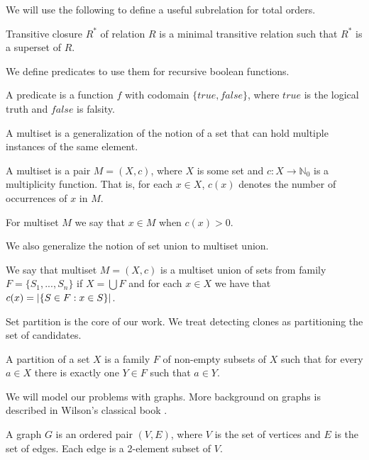 We will use the following to define a useful subrelation for total orders.

\begin{defn}
Transitive closure $R^*$ of relation $R$ is a minimal transitive relation 
such that $R^*$ is a superset of $R$.
\end{defn}

We define predicates to use them for recursive boolean functions.

\begin{defn}[predicate]
A predicate is a function $f$ with codomain $\{true, false\}$,
where $true$ is the logical truth and $false$ is falsity.
\end{defn}

A multiset is a generalization of the notion of a set that can hold multiple instances of the same element.

\begin{defn}[multiset]
A multiset is a pair $M = (X, c)$, where $X$ is some set and $c:X \rightarrow \mathbb{N}_0$
is a multiplicity function.
That is, for each $x \in X$, $c(x)$ denotes the number of occurrences of $x$ in $M$.
\end{defn}

For multiset $M$ we say that $x \in M$ when $c(x) > 0$.

We also generalize the notion of set union to multiset union.

\begin{defn}
We say that multiset $M = (X, c)$ is a multiset union of sets from family $F = \{S_1, ..., S_n\}$
if $X = \bigcup F$ and for each $x \in X$ we have that $c(x) = \left\vert \{S \in F : x \in S\} \right\vert$.
\end{defn}

Set partition is the core of our work.
We treat detecting clones as partitioning the set of candidates.

\begin{defn}
A partition of a set $X$ is a family $F$ of non-empty subsets of $X$
such that for every $a \in X$ there is exactly one $Y \in F$ such that $a \in Y$.
\end{defn}

We will model our problems with graphs.
More background on graphs is described in Wilson's classical book \cite{graphtheory}.

\begin{defn}[graph]
A graph $G$ is an ordered pair $(V,E)$, where $V$ is the set of vertices and $E$ is the set of edges.
Each edge is a 2-element subset of $V$.
\end{defn}

